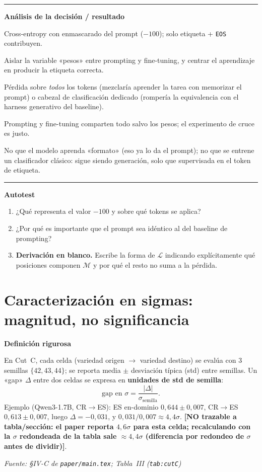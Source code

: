 \documentclass[11pt,a4paper]{article}
\newcommand{\nivel}[1]{\medskip\noindent\textbf{\textcolor{blue!45!black}{#1}}\par\nopagebreak\smallskip}
\newcommand{\fuente}[1]{\nopagebreak\par\hfill{\footnotesize\textit{Fuente: #1}}\par}
\newcommand{\notrace}[1]{{\footnotesize\textcolor{orange!75!black}{\textbf{[NO trazable a tabla/sección: #1]}}}}
\newenvironment{analisis}{%
  \medskip\par\noindent\rule{\linewidth}{0.4pt}\par\nopagebreak
  \textbf{Análisis de la decisión / resultado}\par\nopagebreak\smallskip
  \begin{description}[leftmargin=2.6cm,style=nextline,font=\bfseries]
}{%
  \end{description}\noindent\rule{\linewidth}{0.4pt}\par\medskip
}
\begin{document}
\begin{analisis}
  \item[Qué] Cross-entropy con enmascarado del prompt ($-100$); solo etiqueta + \texttt{EOS}
        contribuyen.
  \item[Por qué] Aislar la variable «pesos» entre prompting y fine-tuning, y centrar el aprendizaje
        en producir la etiqueta correcta.
  \item[Alternativas descartadas] Pérdida sobre \emph{todos} los tokens (mezclaría aprender la tarea
        con memorizar el prompt) o cabezal de clasificación dedicado (rompería la equivalencia con
        el harness generativo del baseline).
  \item[Qué significa] Prompting y fine-tuning comparten todo salvo los pesos; el experimento de
        cruce es justo.
  \item[Qué NO significa] No que el modelo aprenda «formato» (eso ya lo da el prompt); no que se
        entrene un clasificador clásico: sigue siendo generación, solo que supervisada en el token
        de etiqueta.
\end{analisis}

\nivel{Autotest}
\begin{enumerate}[nosep]
  \item ¿Qué representa el valor $-100$ y sobre qué tokens se aplica?
  \item ¿Por qué es importante que el prompt sea idéntico al del baseline de prompting?
  \item \textbf{Derivación en blanco.} Escribe la forma de $\mathcal{L}$ indicando explícitamente
        qué posiciones componen $\mathcal{M}$ y por qué el resto no suma a la pérdida.
\end{enumerate}

\section{Caracterización en sigmas: magnitud, no significancia}\label{sec:sigma}

\nivel{Definición rigurosa}
En Cut~C, cada celda (variedad origen $\to$ variedad destino) se evalúa con 3 semillas
$\{42,43,44\}$; se reporta media $\pm$ desviación típica (std) entre semillas. Un «gap» $\Delta$
entre dos celdas se expresa en \textbf{unidades de std de semilla}:
\[
\text{gap en } \sigma = \frac{|\Delta|}{\sigma_{\text{semilla}}}.
\]
Ejemplo (Qwen3-1.7B, CR$\to$ES): ES en-dominio $0{,}644\pm0{,}007$, CR$\to$ES $0{,}613\pm0{,}007$,
luego $\Delta=-0{,}031$, y $0{,}031/0{,}007\approx 4{,}4\sigma$.
\notrace{el paper reporta $4{,}6\sigma$ para esta celda; recalculando con la $\sigma$ redondeada de
la tabla sale $\approx4{,}4\sigma$ (diferencia por redondeo de $\sigma$ antes de dividir)}.
\fuente{\S IV-C de \texttt{paper/main.tex}; Tabla~III (\texttt{tab:cutC})}
\end{document}
